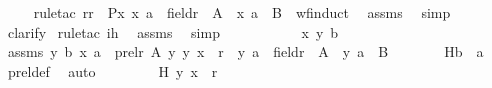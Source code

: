 \begin{isabellebody}
\ \ \ \ \isamarkupfalse%
{\isacharparenleft}{\kern0pt}rule{\isacharunderscore}{\kern0pt}tac\ r{\isacharequal}{\kern0pt}r\ \ P{\isacharequal}{\kern0pt}{\isachardoublequoteopen}{\isasymlambda}x{\isachardot}{\kern0pt}\ {\isacharless}{\kern0pt}x{\isacharcomma}{\kern0pt}\ a{\isachargreater}{\kern0pt}\ {\isasymin}\ field{\isacharparenleft}{\kern0pt}r{\isacharparenright}{\kern0pt}\ {\isasymtimes}\ A\ {\isasymlongrightarrow}\ {\isacharless}{\kern0pt}x{\isacharcomma}{\kern0pt}\ a{\isachargreater}{\kern0pt}\ {\isasymin}\ B{\isachardoublequoteclose}\ \ wf{\isacharunderscore}{\kern0pt}induct{\isacharparenright}{\kern0pt}\ \isamarkupfalse%
\ assms\ \isamarkupfalse%
\ simp\ \isanewline
\ \ \ \ \isamarkupfalse%
\ clarify\ \isamarkupfalse%
{\isacharparenleft}{\kern0pt}rule{\isacharunderscore}{\kern0pt}tac\ ih{\isacharparenright}{\kern0pt}\ \isamarkupfalse%
\ assms\ \isamarkupfalse%
\ simp\ \isanewline
\ \ \isamarkupfalse%
\ {\isacharminus}{\kern0pt}\isanewline
\ \ \ \ \isamarkupfalse%
\ x\ y\ b\ \isamarkupfalse%
\ assms{}{\isacharcolon}{\kern0pt}\ {\isachardoublequoteopen}{\isasymlangle}{\isasymlangle}y{\isacharcomma}{\kern0pt}\ b{\isasymrangle}{\isacharcomma}{\kern0pt}\ x{\isacharcomma}{\kern0pt}\ a{\isasymrangle}\ {\isasymin}\ prel{\isacharparenleft}{\kern0pt}r{\isacharcomma}{\kern0pt}\ A{\isacharparenright}{\kern0pt}{\isachardoublequoteclose}\ {\isachardoublequoteopen}{\isacharparenleft}{\kern0pt}{\isasymAnd}y{\isachardot}{\kern0pt}\ {\isasymlangle}y{\isacharcomma}{\kern0pt}\ x{\isasymrangle}\ {\isasymin}\ r\ {\isasymLongrightarrow}\ {\isasymlangle}y{\isacharcomma}{\kern0pt}\ a{\isasymrangle}\ {\isasymin}\ field{\isacharparenleft}{\kern0pt}r{\isacharparenright}{\kern0pt}\ {\isasymtimes}\ A\ {\isasymlongrightarrow}\ {\isasymlangle}y{\isacharcomma}{\kern0pt}\ a{\isasymrangle}\ {\isasymin}\ B{\isacharparenright}{\kern0pt}{\isachardoublequoteclose}\isanewline
\ \ \ \ \isamarkupfalse%
\ \isamarkupfalse%
\ H{}{\isacharcolon}{\kern0pt}{\isachardoublequoteopen}b\ {\isacharequal}{\kern0pt}\ a{\isachardoublequoteclose}\ \isamarkupfalse%
\ prel{\isacharunderscore}{\kern0pt}def\ \isamarkupfalse%
\ auto\ \isanewline
\ \ \ \ \isamarkupfalse%
\ \isamarkupfalse%
\ H{}{\isacharcolon}{\kern0pt}\ {\isachardoublequoteopen}{\isacharless}{\kern0pt}y{\isacharcomma}{\kern0pt}\ x{\isachargreater}{\kern0pt}\ {\isasymin}\ r{\isachardoublequoteclose}\ \isamarkupfalse%

\end{isabellebody}
